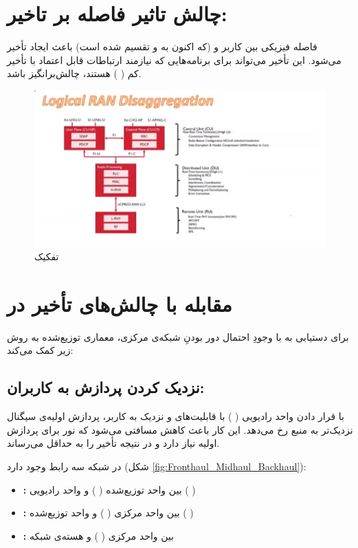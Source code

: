 \documentclass[landscape, 12pt]{report}
\begin{document}
\section*{چالش تاثیر فاصله بر تاخیر: }
فاصله فیزیکی بین کاربر و
(که اکنون به
و
تقسیم شده است) باعث ایجاد تأخیر می‌شود. این تأخیر می‌تواند برای برنامه‌هایی که نیازمند ارتباطات قابل اعتماد با تأخیر کم (
) هستند، چالش‌برانگیز باشد.
\begin{figure}[ht]
	\centering
	\includegraphics[width=.6\linewidth]{Pic/Logical_RAN_Disaggregation}
	\caption{
		تفکیک
	}
	\label{fig:Logical_RAN_Disaggregation}
\end{figure}

\section*{مقابله با چالش‌های تأخیر در
	   }
برای دستیابی به
 با وجودِ احتمال دور بودنِ شبکه‌ی مرکزی، معماری توزیع‌شده به روش زیر کمک می‌کند:
 \subsection*{نزدیک کردن پردازش به کاربران:}
با قرار دادن واحد رادیویی (
) با قابلیت‌های
   و
     نزدیک به کاربر، پردازش اولیه‌ی سیگنال نزدیک‌تر به منبع رخ می‌دهد. این کار باعث کاهش مسافتی می‌شود که نور برای پردازش اولیه نیاز دارد و در نتیجه تأخیر را به حداقل می‌رساند.
     
     
 در شبکه
   سه رابط وجود دارد (شکل \ref{fig:Fronthaul_Midhaul_Backhaul}):
   \begin{itemize}
   	\item \textbf{:}
   	  بین واحد توزیع‌شده (
   	  ) و واحد رادیویی (
   	  )
   	\item \textbf{:}
   	بین واحد مرکزی (
   	) و واحد توزیع‌شده (
   	)
   	\item \textbf{:}
   	بین واحد مرکزی (
   	) و هسته‌ی شبکه
   \end{itemize}
     
\end{document}
